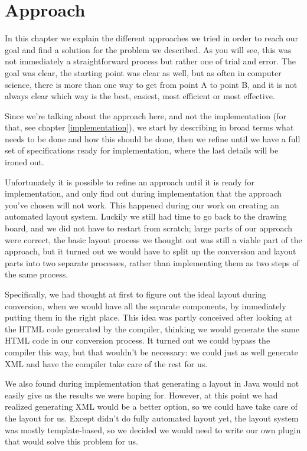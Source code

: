 
 \chapter{Approach}

  In this chapter we explain the different approaches we tried in order to
  reach our goal and find a solution for the problem we described. As you will
  see, this was not immediately a straightforward process but rather one of
  trial and error. The goal was clear, the starting point was clear as well,
  but as often in computer science, there is more than one way to get from
  point A to point B, and it is not always clear which way is the best,
  easiest, most efficient or most effective.
 
  Since we're talking about the approach here, and not the implementation (for
  that, see chapter \ref{implementation}), we start by describing in broad
  terms what needs to be done and how this should be done, then we refine until
  we have a full set of specifications ready for implementation, where the last
  details will be ironed out.

  Unfortunately it is possible to refine an approach until it is ready for
  implementation, and only find out during implementation that the approach
  you've chosen will not work. This happened during our work on creating an
  automated layout system. Luckily we still had time to go back to the drawing
  board, and we did not have to restart from scratch; large parts of our
  approach were correct, the basic layout process we thought out was still a
  viable part of the approach, but it turned out we would have to split up the
  conversion and layout parts into two separate processes, rather than
  implementing them as two steps of the same process.
  
  Specifically, we had thought at first to figure out the ideal layout during
  conversion, when we would have all the separate components, by immediately
  putting them in the right place. This idea was partly conceived after looking
  at the HTML code generated by the \mxp compiler, thinking we would generate
  the same HTML code in our conversion process. It turned out we could bypass
  the \mxp compiler this way, but that wouldn't be necessary: we could just as
  well generate \mxp XML and have the compiler take care of the rest for us.
 
  We also found during implementation that generating a layout in Java would
  not easily give us the results we were hoping for. However, at this point we
  had realized generating \mxp XML would be a better option, so we could have
  \mxp take care of the layout for us. Except \mxp didn't do fully automated
  layout yet, the layout system was mostly template-based, so we decided we
  would need to write our own \mxp plugin that would solve this problem for us.


